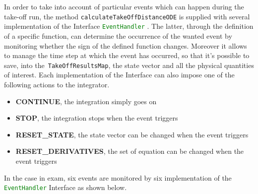 \bigskip
\noindent
In order to take into account of particular events which can happen during the take-off run, the method \lstinline[language=Java]!calculateTakeOffDistanceODE! is supplied with several implementation of the \gls{Interface} \lstinline[language=Java]!EventHandler! \cite{apache:ode}. The latter, through the definition of a specific function, can determine the occurrence of the wanted event by monitoring whether the sign of the defined function changes. Moreover it allows to manage the time step at which the event has occurred, so that it's possible to save, into the~\lstinline[language=Java]!TakeOffResultsMap!, the state vector and all the physical quantities of interest. Each implementation of the \gls{Interface} can also impose one of the following actions to the integrator.
%
\begin{itemize}
\item \textbf{CONTINUE}, the integration simply goes on
\item \textbf{STOP}, the integration stops when the event triggers
\item \textbf{RESET_STATE}, the state vector can be changed when the event triggers 
\item \textbf{RESET_DERIVATIVES}, the set of equation can be changed when the event triggers 
\end{itemize}
%
In the case in exam, six events are monitored by six implementation of the \lstinline[language=Java]!EventHandler! \gls{Interface} as shown below.
%
